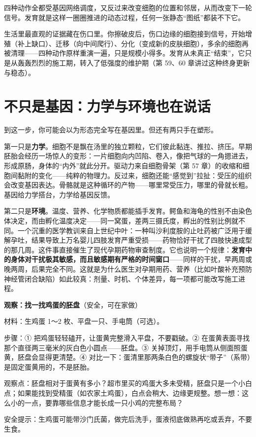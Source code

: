 四种动作全都受基因网络调度，又反过来改变细胞的位置和邻居，从而改变下一轮信号。发育就是这样一圈圈推进的动态过程，任何一张静态“图纸”都装不下它。

生活里最直观的证据藏在伤口里。你擦破皮后，伤口边缘的细胞接到信号，开始增殖（补上缺口）、迁移（向中间爬行）、分化（变成新的皮肤细胞），多余的细胞再被清理——四种动作原样重演一遍，只是规模小得多。发育从未真正“结束”，它只是从轰轰烈烈的施工期，转入了低强度的维护期（第 59、60 章讲过这种终身更新与稳态）。

\section{不只是基因：力学与环境也在说话}

到这一步，你可能会以为形态完全写在基因里。但还有两只手在塑形。

第一只是\textbf{力学}。细胞不是飘在汤里的独立颗粒，它们彼此黏连、推拉、挤压。早期胚胎会经历一场惊人的变形：一片细胞向内凹陷、卷入，像把气球的一角摁进去，形成原肠，身体的“内外”就此分开。驱动力来自细胞骨架（第 57 章）的收缩和细胞间黏附的变化——纯粹的物理力。反过来，细胞还能“感觉到”拉扯：受压的组织会改变基因表达。骨骼就是这种循环的产物——哪里常受压力，哪里的骨就长粗。基因给力学搭台，力学给基因反馈。

第二只是\textbf{环境}。温度、营养、化学物质都能插手发育。鳄鱼和海龟的性别不由染色体决定，而由孵化温度决定——同一窝蛋，差两三摄氏度，孵出的性别比例就不同。一个沉重的医学教训来自上世纪中叶：一种叫沙利度胺的止吐药被广泛用于缓解孕吐，结果导致上万名婴儿四肢发育严重受损——药物恰好干扰了四肢快速成型的那几周。这件事直接催生了现代孕期药物审查制度。它也说明一个规律：\textbf{发育中的身体对干扰极其敏感，而且敏感期有严格的时间窗口}——同样的干扰，早两周或晚两周，后果完全不同。这就是为什么医生对孕期用药、营养（比如叶酸补充预防神经管闭合缺陷）如此较真：剂量、时机、个体差异，每一项都可能改写施工进程。

\begin{shiyan}
\textbf{观察：找一找鸡蛋的胚盘}（安全，可在家做）

材料：生鸡蛋 1～2 枚、平盘一只、手电筒（可选）。

步骤：① 把鸡蛋轻轻磕开，让蛋黄完整滑入平盘，不要戳破。② 在蛋黄表面寻找那个直径两三毫米的灰白色小圆点——胚盘。③ 关掉顶灯，用手电筒从侧面照蛋黄，胚盘会显得更清楚。④ 对比一下：蛋清里那两条白色的螺旋状“带子”（系带）是固定蛋黄用的，不是胚胎。

观察点：胚盘相对于蛋黄有多小？超市里买的鸡蛋大多未受精，胚盘只是一个小白点；如果能找到受精蛋（如农家土鸡蛋），白点会稍大、边缘更规整。想一想：这么小的一点，要靠哪些信息才能长成一只小鸡的完整布局？

安全提示：生鸡蛋可能带沙门氏菌，做完后洗手，蛋液彻底做熟再吃或丢弃，不要生食。
\end{shiyan}

